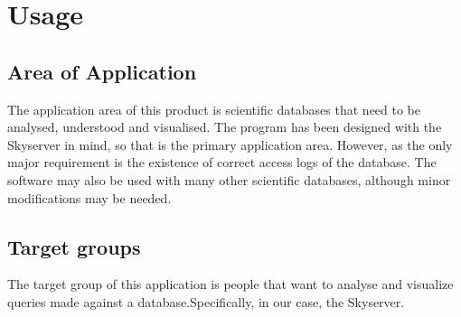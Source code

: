 \section{Usage}
\subsection{Area of Application}
The application area of this product is scientific databases that need to be analysed, %
 understood and visualised.
The program has been designed with the Skyserver in mind,
 so that is the primary application area.
However, as the only major requirement is the existence of correct access logs of the database.
The software may also be used with many other scientific databases,
 although minor modifications may be needed.


%



\subsection{Target groups}

The target group of this application is people that want to analyse 
and visualize queries made against a database.Specifically,
in our case, the Skyserver.

